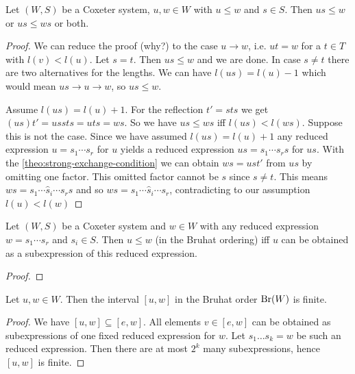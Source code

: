 \begin{prop}
	Let $(W,S)$ be a Coxeter system, $u,w \in W$ with $u \leq w$ and $s \in S$. Then $us \leq w$ or $us \leq ws$ or both.

	\begin{proof}
		We can reduce the proof (\todo why?) to the case $u \to w$, i.e. $ut = w$ for a $t \in T$ with $l(v) < l(u)$. Let $s = t$. Then $us \leq w$ and we are done. In case $s \neq t$ there are two alternatives for the lengths. We can have $l(us) = l(u) - 1$ which would mean $us \to u \to w$, so $us \leq w$.

		Assume $l(us) = l(u) + 1$. For the reflection $t' = sts$ we get $(us)t' = ussts = uts = ws$. So we have $us \leq ws$ iff $l(us) < l(ws)$. Suppose this is not the case. Since we have assumed $l(us) = l(u) + 1$ any reduced expression $u = s_1 \cdots s_r$ for $u$ yields a reduced expression $us = s_1 \cdots s_r s$ for $us$. With the \ref{theo:strong-exchange-condition} we can obtain $ws = ust'$ from $us$ by omitting one factor. This omitted factor cannot be $s$ since $s \neq t$. This means $ws = s_1 \cdots \hat s_i \cdots s_r s$ and so $ws = s_1 \cdots \hat s_i \cdots s_r$, contradicting to our assumption $l(u) < l(w)$
	\end{proof}
\end{prop}

\begin{theo}
	Let $(W,S)$ be a Coxeter system and $w \in W$ with any reduced expression $w = s_1 \cdots s_r$ and $s_i \in S$. Then $u \leq w$ (in the Bruhat ordering) iff $u$ can be obtained as a subexpression of this reduced expression.

	\begin{proof}
		\todo
	\end{proof}
\end{theo}

\begin{coro}
	Let $u,w \in W$. Then the interval $[u,w]$ in the Bruhat order $\operatorname{Br}(W)$ is finite.

	\begin{proof}
		We have $[u,w] \subseteq [e,w]$. All elements $v \in [e,w]$ can be obtained as subexpressions of one fixed reduced expression for $w$. Let $s_1 \ldots s_k = w$ be such an reduced expression. Then there are at most $2^k$ many subexpressions, hence $[u,w]$ is finite.
	\end{proof}
\end{coro}

